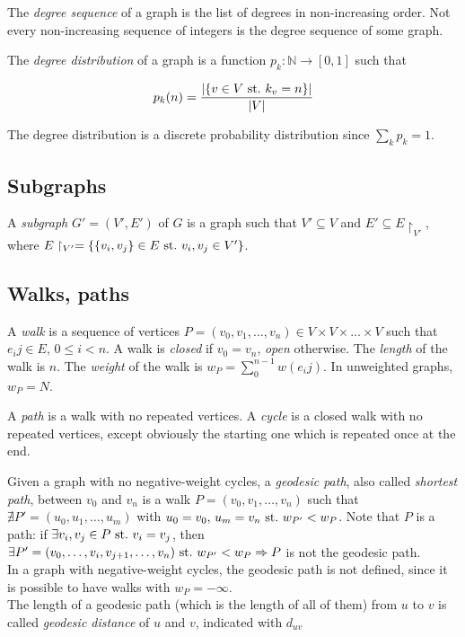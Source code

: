 \documentclass[oneside,openany]{memoir}
\begin{document}
The \emph{degree sequence} of a graph is the list of degrees in
non-increasing order. Not every non-increasing sequence of integers is
the degree sequence of some graph.

The \emph{degree distribution} of a graph is a function
$p_k: \mathbb{N} \rightarrow [0, 1]$ such that

\begin{equation*}
p_k(n) = \frac{\left\vert{ \{v \in V \st k_v = n\} }\right\vert}{|V|}
\end{equation*}

The degree distribution is a discrete probability distribution since
$\sum_{k} p_k = 1$.

\subsection{Subgraphs}\label{subgraphs}

A \emph{subgraph} $G' = (V', E')$ of $G$ is a graph such that
$V' \subseteq V$ and $E' \subseteq E\restriction_{V'}$, where
$E\restriction_{V'} = \{\{v_i, v_j\} \in E \st v_i,v_j \in V'\}$.

\subsection{Walks, paths}\label{walks-paths}

A \emph{walk} is a sequence of vertices
$P = (v_0, v_1, \ldots, v_n) \in V \times V \times \ldots \times V$ such
that $e_ij \in E,\, 0 \leq i < n$. A walk is \emph{closed} if
$v_0 = v_n$, \emph{open} otherwise. The \emph{length} of the walk is
$n$. The \emph{weight} of the walk is $w_P = \sum_0^{n-1} w(e_ij)$. In
unweighted graphs, $w_P = N$.

A \emph{path} is a walk with no repeated vertices. A \emph{cycle} is a
closed walk with no repeated vertices, except obviously the starting one
which is repeated once at the end.

Given a graph with no negative-weight cycles, a \emph{geodesic path},
also called \emph{shortest path}, between $v_0$ and $v_n$ is a walk
$P = (v_0, v_1, \ldots, v_n)$ such that
$\nexists P' = (u_0, u_1, \ldots, u_m)$ with
$u_0 = v_0,\, u_m = v_n \st w_{P'} < w_P$. Note that $P$ is a path: if
$\exists v_i, v_j \in P \st v_i = v_j$, then
$\exists P' = (v_0, \ldots, v_i, v_{j+1}, \ldots, v_n) \st w_{P'} < w_P \Rightarrow P$
is not the geodesic path.\\In a graph with negative-weight cycles, the
geodesic path is not defined, since it is possible to have walks with
$w_P = -\infty$.\\The length of a geodesic path (which is the length of
all of them) from $u$ to $v$ is called \emph{geodesic distance} of $u$
and $v$, indicated with $d_{uv}$
\end{document}
